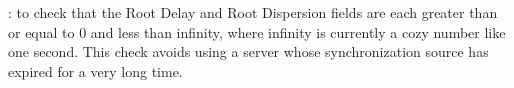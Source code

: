 \begin{DoxyRefList}
\+: to check that the Root Delay and Root Dispersion fields are each greater than or equal to 0 and less than infinity, where infinity is currently a cozy number like one second. This check avoids using a server whose synchronization source has expired for a very long time. 
\end{DoxyRefList}
